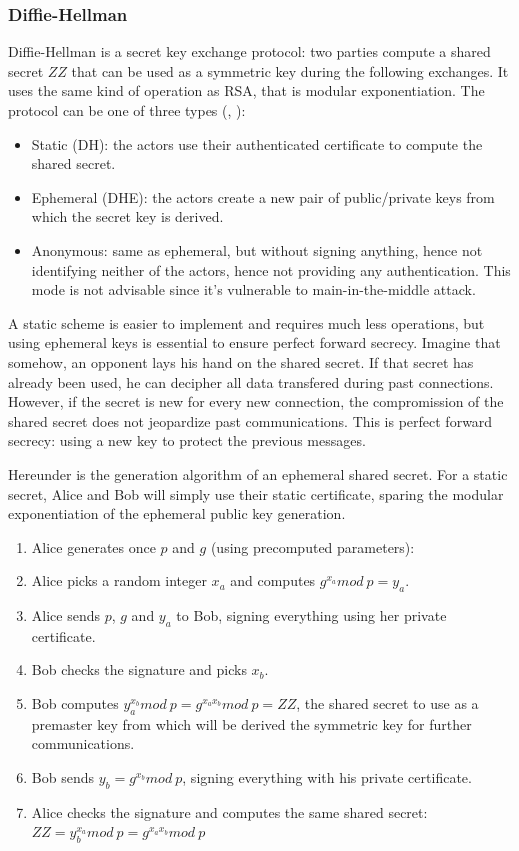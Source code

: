 \subsubsection{Diffie-Hellman}
Diffie-Hellman is a secret key exchange protocol: two parties compute a shared secret $ZZ$ that can be used as a symmetric key during the following exchanges.
It uses the same kind of operation as RSA, that is modular exponentiation.
The protocol can be one of three types (\cite{rfc2631}, \cite{Frankel:2005:SGI:2206289}):
\begin{itemize}
	\item Static (DH): the actors use their authenticated certificate to compute the shared secret.
	\item Ephemeral (DHE): the actors create a new pair of public/private keys from which the secret key is derived.
	\item Anonymous: same as ephemeral, but without signing anything, hence not identifying neither of the actors, hence not providing any authentication. This mode is not advisable since it's vulnerable to main-in-the-middle attack.
\end{itemize}
A static scheme is easier to implement and requires much less operations, but using ephemeral keys is essential to ensure perfect forward secrecy.
Imagine that somehow, an opponent lays his hand on the shared secret.
If that secret has already been used, he can decipher all data transfered during past connections.
However, if the secret is new for every new connection, the compromission of the shared secret does not jeopardize past communications.
This is perfect forward secrecy: using a new key to protect the previous messages.

Hereunder is the generation algorithm of an ephemeral shared secret.
For a static secret, Alice and Bob will simply use their static certificate, sparing the modular exponentiation of the ephemeral public key generation.
\begin{enumerate}
	\item Alice generates once $p$ and $g$ (using precomputed parameters):
	\begin{description}[nosep]
		\item[p] large prime number
		\item[g] a generator of $\mathds{Z}_p^*$
	\end{description}
	\item Alice picks a random integer $x_a$ and computes $g^{x_a} mod\ p = y_a$.
	\item Alice sends $p$, $g$ and $y_a$ to Bob, signing everything using her private certificate.
	\item Bob checks the signature and picks $x_b$.
	\item Bob computes $y_a^{x_b} mod\ p = g^{x_a x_b} mod\ p = ZZ$, the shared secret to use as a premaster key from which will be derived the symmetric key for further communications.
	\item Bob sends $y_b = g^{x_b} mod\ p$, signing everything with his private certificate.
	\item Alice checks the signature and computes the same shared secret: $ZZ = y_b^{x_a} mod\ p = g^{x_a x_b} mod\ p$
\end{enumerate}

